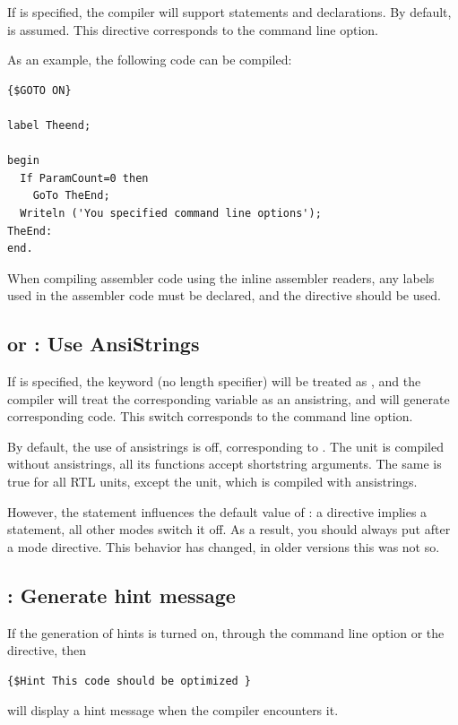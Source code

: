 If  is specified, the compiler will support 
statements and  declarations. By default,  is
assumed. This directive corresponds to the  command line option.

As an example, the following code can be compiled:
\begin{verbatim}
{$GOTO ON}

label Theend;

begin
  If ParamCount=0 then
    GoTo TheEnd;
  Writeln ('You specified command line options');
TheEnd:
end.
\end{verbatim}

\begin{remark}When compiling assembler code using the inline assembler
readers, any labels used in the assembler code must be declared, and 
the  directive should be used.
\end{remark}

\subsection{ or  : Use AnsiStrings}

If  is specified, the keyword  (no
length specifier) will be treated as , and the compiler
will treat the corresponding variable as an ansistring, and will
generate corresponding code. This switch corresponds to the 
command line option.

By default, the use of ansistrings is off, corresponding to .
The  unit is compiled without ansistrings, all its functions accept
shortstring arguments. The same is true for all RTL units, except the
 unit, which is compiled with ansistrings.

However, the  statement influences the default value of
: a  directive implies a
 statement, all other modes switch it off. As a result,
you should always put  after a mode directive. 
This behavior has changed, in older \fpc versions this was not so. 

\subsection{ : Generate hint message}

If the generation of hints is turned on, through the  command line
option or the  directive, then
\begin{verbatim}
{$Hint This code should be optimized }
\end{verbatim}
will display a hint message when the compiler encounters it.

